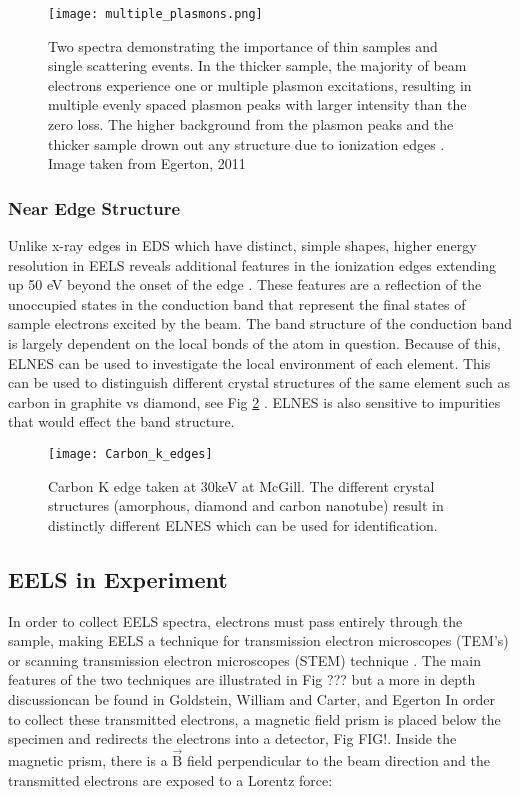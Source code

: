 \begin{figure}
	\centering
	\texttt{[image: multiple\_plasmons.png]}
	\caption{Two spectra demonstrating the importance of thin samples and single scattering events. In the thicker sample, the majority of beam electrons experience one or multiple plasmon excitations, resulting in multiple evenly spaced plasmon peaks with larger intensity than the zero loss.  The higher background from the plasmon peaks and the thicker sample drown out any structure due to ionization edges \cite{Egerton}. Image taken from Egerton, 2011 \cite{Egerton}}
	\label{multiple_plasmons}
\end{figure}



\subsubsection{Near Edge Structure}
Unlike x-ray edges in EDS which have distinct, simple shapes, higher energy resolution in EELS reveals additional features in the ionization edges extending up 50 eV beyond the onset of the edge \cite{Egerton}.   These features are a reflection of the unoccupied states in the conduction band that represent the final states of sample electrons excited by the beam.  The band structure of the conduction band is largely dependent on the local bonds of the atom in question.  Because of this, ELNES can be used to investigate the local environment of each element.  This can be used to distinguish different crystal structures of the same element such as carbon in graphite vs diamond, see Fig \ref{carbon-k-edge} \cite{hamon_elnes_2004}.  ELNES is also sensitive to impurities that would effect the band structure.  

\begin{figure}
	\centering
	\texttt{[image: Carbon\_k\_edges]}
	\caption{Carbon K edge taken at 30keV at McGill. The different crystal structures (amorphous, diamond and carbon nanotube) result in distinctly different ELNES which can be used for identification.   }
	\label{carbon-k-edge}
\end{figure}


\subsection{EELS in Experiment}

In order to collect EELS spectra, electrons must pass entirely through the sample, making EELS a technique for transmission electron microscopes (TEM's) or scanning transmission electron microscopes (STEM) technique \cite{Egerton}. The main features of the two techniques are illustrated in Fig ??? but a more in depth discussioncan be found in Goldstein, William and Carter, and Egerton \cite{Egerton,williams_transmission_2008,goldstein_electron_2003} In order to collect these transmitted electrons, a magnetic field prism is placed below the specimen and redirects the electrons into a detector, Fig FIG!.  Inside the magnetic prism, there is a $\mathrm{\vec{B}}$ field perpendicular to the beam direction and the transmitted electrons are exposed to a Lorentz force: 


